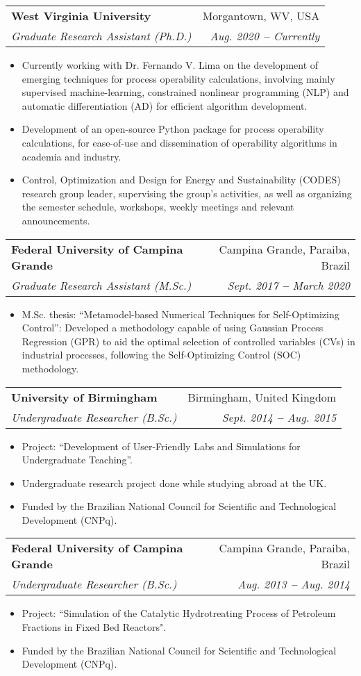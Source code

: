 \documentclass[letterpaper,12pt]{article}
\makeatletter
\newcommand{\resumeItem}[1]{
  \item\small{
    {#1 \vspace{-2pt}}
  }
}
\newcommand{\resumeSubheading}[4]{
  \vspace{-2pt}\item
    \begin{tabular*}{0.97\textwidth}[t]{l@{\extracolsep{\fill}}r}
      \textbf{#1} & #2 \\
      \textit{\small#3} & \textit{\small #4} \\
    \end{tabular*}\vspace{-7pt}
}
\newcommand{\resumeItemListStart}{\begin{itemize}}
\newcommand{\resumeItemListEnd}{\end{itemize}\vspace{-5pt}}
\makeatother
\begin{document}
    \resumeSubheading
      {West Virginia University}{Morgantown, WV, USA}
      {Graduate Research Assistant (Ph.D.)}{Aug. 2020 \textbf{--} Currently}
        \resumeItemListStart
            \resumeItem{Currently working with Dr. Fernando V. Lima on the development of emerging techniques for process operability calculations, involving mainly supervised machine-learning, constrained nonlinear programming (NLP) and automatic differentiation (AD) for efficient algorithm development.}
            \resumeItem{Development of an open-source Python package for process operability calculations, for ease-of-use and dissemination of operability algorithms in academia and industry.}
            \resumeItem{Control, Optimization and Design for Energy and Sustainability (CODES) research group leader, supervising the group's activities, as well as organizing the semester schedule, workshops, weekly meetings and relevant announcements.}
        \resumeItemListEnd
    
    \resumeSubheading
      {Federal University of Campina Grande}{Campina Grande, Paraiba, Brazil}
      {Graduate Research Assistant (M.Sc.)}{Sept. 2017 \textbf{--} March 2020}
        \resumeItemListStart
            \resumeItem{M.Sc. thesis: ``Metamodel-based Numerical Techniques for Self-Optimizing Control'': Developed a methodology capable of using Gaussian Process Regression (GPR) to aid the optimal selection of controlled variables (CVs) in industrial processes, following the Self-Optimizing Control (SOC) methodology.}
        \resumeItemListEnd





    \resumeSubheading
    {University of Birmingham}{Birmingham, United Kingdom}
      {Undergraduate Researcher (B.Sc.)}{Sept. 2014 \textbf{--} Aug. 2015}
        \resumeItemListStart
            \resumeItem{Project: ``Development of User-Friendly Labs and Simulations for Undergraduate Teaching''.}
            \resumeItem{Undergraduate research project done while studying abroad at the UK.}
            \resumeItem{Funded by the Brazilian National Council for Scientific and Technological Development (CNPq).}
      \resumeItemListEnd

    \resumeSubheading
    {Federal University of Campina Grande}{Campina Grande, Paraiba, Brazil}
      {Undergraduate Researcher (B.Sc.)}{Aug. 2013 \textbf{--} Aug. 2014}
        \resumeItemListStart
            \resumeItem{Project: ``Simulation of the Catalytic Hydrotreating Process of Petroleum Fractions in Fixed Bed Reactors".}
            \resumeItem{Funded by the Brazilian National Council for Scientific and Technological Development (CNPq).}
      \resumeItemListEnd
\end{document}
